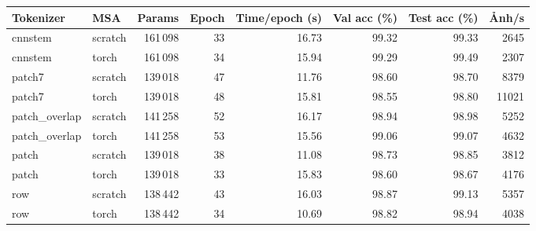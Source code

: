 \begin{tabular}{llrrrrrr}
\toprule
Tokenizer & MSA & Params & Epoch & Time/epoch (s) & Val acc (\%) & Test acc (\%) & Ảnh/s \\
\midrule
cnnstem & scratch & 161\,098 & 33 & 16.73 & 99.32 & 99.33 & 2645 \\
cnnstem & torch & 161\,098 & 34 & 15.94 & 99.29 & 99.49 & 2307 \\
\addlinespace
patch7 & scratch & 139\,018 & 47 & 11.76 & 98.60 & 98.70 & 8379 \\
patch7 & torch & 139\,018 & 48 & 15.81 & 98.55 & 98.80 & 11021 \\
\addlinespace
patch\_overlap & scratch & 141\,258 & 52 & 16.17 & 98.94 & 98.98 & 5252 \\
patch\_overlap & torch & 141\,258 & 53 & 15.56 & 99.06 & 99.07 & 4632 \\
\addlinespace
patch & scratch & 139\,018 & 38 & 11.08 & 98.73 & 98.85 & 3812 \\
patch & torch & 139\,018 & 33 & 15.83 & 98.60 & 98.67 & 4176 \\
\addlinespace
row & scratch & 138\,442 & 43 & 16.03 & 98.87 & 99.13 & 5357 \\
row & torch & 138\,442 & 34 & 10.69 & 98.82 & 98.94 & 4038 \\
\bottomrule
\end{tabular}
